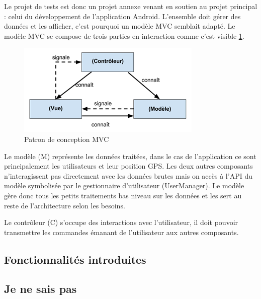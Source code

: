 Le projet de tests est donc un projet annexe venant en soutien au projet principal : celui du développement de l’application Android. L’ensemble doit gérer des données et les afficher, c’est pourquoi un modèle MVC semblait adapté. Le modèle MVC se compose de trois parties en interaction comme c’est visible \ref{mvc}. 

\begin{figure}
    \centering
    \includegraphics{./img/mvc.png}
    \caption{Patron de conception MVC}
    \label{mvc}
\end{figure}

Le modèle (M) représente les données traitées, dans le cas de l’application ce sont principalement les utilisateurs et leur position GPS. Les deux autres composants n’interagissent pas directement avec les données brutes mais on accès à l’API du modèle symbolisée par le gestionnaire d’utilisateur (UserManager). Le modèle gère donc tous les petits traitements bas niveau sur les données et les sert au reste de l’architecture selon les besoins.

Le contrôleur (C) s’occupe des interactions avec l’utilisateur, il doit pouvoir transmettre les commandes émanant de l’utilisateur aux autres composants.

\subsection{Fonctionnalités introduites}


\subsection{Je ne sais pas}
